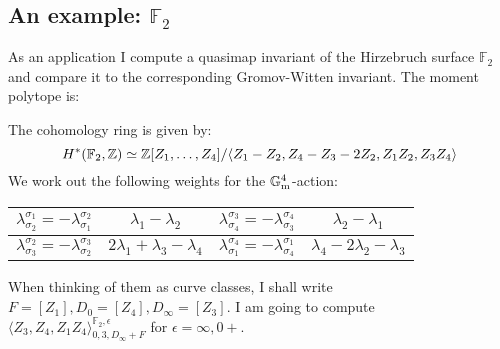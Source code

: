 \subsection{An example: $\mathbb F_2$} As an application I compute a quasimap invariant of the Hirzebruch surface $\mathbb F_2$ and compare it to the corresponding Gromov-Witten invariant. The moment polytope is:
\begin{center}
\end{center}
The cohomology ring is given by:
\[
 H^*(\mathbb F_2,\mathbb{Z})\simeq\mathbb{Z}[Z_1,\ldots,Z_4]/\langle Z_1-Z_2,Z_4-Z_3-2Z_2, Z_1Z_2,Z_3Z_4\rangle
\]
We work out the following weights for the $\mathbb{G}_{\text{m}}^4$-action:

\begin{center}
 \begin{tabular}{||c|c||c|c||}
  \hline
  $\lambda^{\sigma_1}_{\sigma_2}=-\lambda^{\sigma_2}_{\sigma_1}$ & $\lambda_1-\lambda_2$ & $\lambda^{\sigma_3}_{\sigma_4}=-\lambda^{\sigma_4}_{\sigma_3}$ & $\lambda_2-\lambda_1$ \\
  \hline
  $\lambda^{\sigma_2}_{\sigma_3}=-\lambda^{\sigma_3}_{\sigma_2}$ & $2\lambda_1+\lambda_3-\lambda_4$ & $\lambda^{\sigma_4}_{\sigma_1}=-\lambda^{\sigma_1}_{\sigma_4}$ & $\lambda_4-2\lambda_2-\lambda_3$ \\
  \hline
 \end{tabular}
\end{center}

When thinking of them as curve classes, I shall write $F=[Z_1], D_0=[Z_4], D_\infty=[Z_3]$. I am going to compute $\langle Z_3,Z_4,Z_1Z_4\rangle^{\mathbb F_2,\epsilon}_{0,3,D_\infty+F}$ for $\epsilon=\infty,0+$.

